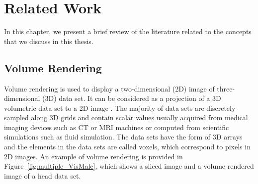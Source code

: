 \chapter{Related Work \label{related_work_chapter}}
In this chapter, we present a brief review of the literature related to the concepts that we discuss in this thesis.

\section{Volume Rendering \label{volume_rendering}}

Volume rendering is used to display a two-dimensional (2D) image of three-dimensional (3D) data set. It can be considered as a projection of a 3D volumetric data set to a 2D image \cite{garcia_parallel_2006}.
The majority of data sets are discretely sampled along 3D grids and contain scalar values usually acquired from medical imaging devices such as CT or MRI machines or computed from scientific simulations such as fluid simulation.
The data sets have the form of 3D arrays and the elements in the data sets are called voxels, which correspond to pixels in 2D images.
An example of volume rendering is provided in Figure~\ref{fig:multiple_VisMale}, which shows a sliced image and a volume rendered image of a head data set.

